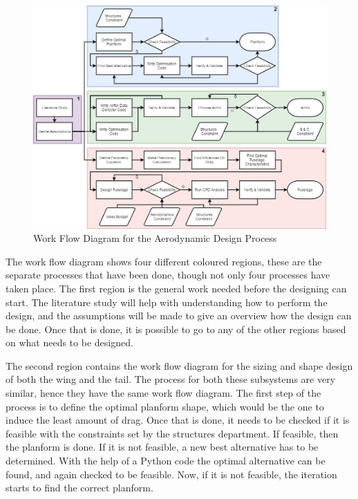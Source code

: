 \begin{figure}[H]
    \centering
    \includegraphics[scale=0.45]{Aerodynamics/Figures/Aerodynamic.png}
    \caption{Work Flow Diagram for the Aerodynamic Design Process}
    \label{fig:flow:aerodynamics}
\end{figure}

The work flow diagram shows four different coloured regions, these are the separate processes that have been done, though not only four processes have taken place. The first region is the general work needed before the designing can start. The literature study will help with understanding how to perform the design, and the assumptions will be made to give an overview how the design can be done. Once that is done, it is possible to go to any of the other regions based on what needs to be designed.

The second region contains the work flow diagram for the sizing and shape design of both the wing and the tail. The process for both these subsystems are very similar, hence they have the same work flow diagram. The first step of the process is to define the optimal planform shape, which would be the one to induce the least amount of drag. Once that is done, it needs to be checked if it is feasible with the constraints set by the structures department. If feasible, then the planform is done. If it is not feasible, a new best alternative has to be determined. With the help of a Python code the optimal alternative can be found, and again checked to be feasible. Now, if it is not feasible, the iteration starts to find the correct planform.

